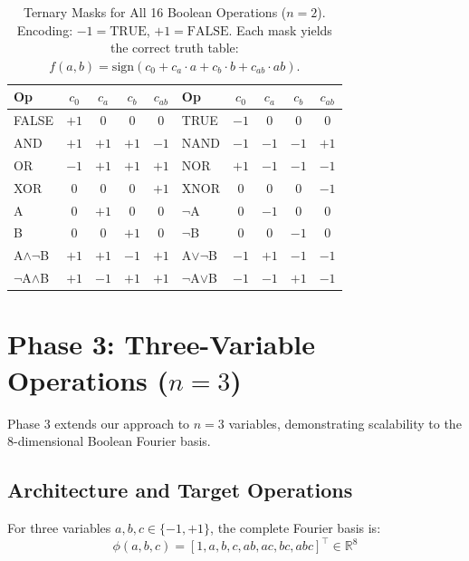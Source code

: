 \documentclass[Royal,times,sageh]{sagej}
\newcommand{\sign}{\text{sign}}
\begin{document}
\begin{table}[t]
\centering
\caption{Ternary Masks for All 16 Boolean Operations ($n=2$). Encoding: $-1 = \text{TRUE}$, $+1 = \text{FALSE}$. Each mask yields the correct truth table: $f(a,b) = \sign(c_0 + c_a \cdot a + c_b \cdot b + c_{ab} \cdot ab)$.}
\label{tab:ternary}
\small
\begin{tabular}{lcccc|lcccc}
\toprule
\textbf{Op} & $c_0$ & $c_a$ & $c_b$ & $c_{ab}$ & \textbf{Op} & $c_0$ & $c_a$ & $c_b$ & $c_{ab}$ \\
\midrule
FALSE & $+1$ & $0$ & $0$ & $0$ & TRUE & $-1$ & $0$ & $0$ & $0$ \\
AND & $+1$ & $+1$ & $+1$ & $-1$ & NAND & $-1$ & $-1$ & $-1$ & $+1$ \\
OR & $-1$ & $+1$ & $+1$ & $+1$ & NOR & $+1$ & $-1$ & $-1$ & $-1$ \\
XOR & $0$ & $0$ & $0$ & $+1$ & XNOR & $0$ & $0$ & $0$ & $-1$ \\
A & $0$ & $+1$ & $0$ & $0$ & $\neg$A & $0$ & $-1$ & $0$ & $0$ \\
B & $0$ & $0$ & $+1$ & $0$ & $\neg$B & $0$ & $0$ & $-1$ & $0$ \\
A$\land\neg$B & $+1$ & $+1$ & $-1$ & $+1$ & A$\lor\neg$B & $-1$ & $+1$ & $-1$ & $-1$ \\
$\neg$A$\land$B & $+1$ & $-1$ & $+1$ & $+1$ & $\neg$A$\lor$B & $-1$ & $-1$ & $+1$ & $-1$ \\
\bottomrule
\end{tabular}
\end{table}

\section{Phase 3: Three-Variable Operations ($n=3$)}
\label{sec:phase3}

Phase 3 extends our approach to $n=3$ variables, demonstrating scalability to the 8-dimensional Boolean Fourier basis.

\subsection{Architecture and Target Operations}

For three variables $a, b, c \in \{-1, +1\}$, the complete Fourier basis is:
\begin{equation}
    \phi(a, b, c) = [1, a, b, c, ab, ac, bc, abc]^\top \in \mathbb{R}^8
\end{equation}
\end{document}
